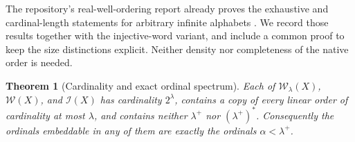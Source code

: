 \documentclass[11pt]{article}
\newtheorem{theorem}{Theorem}[section]
\theoremstyle{definition}
\theoremstyle{remark}
\newcommand{\WO}{\mathcal W}
\begin{document}
The repository's real-well-ordering report already proves the
exhaustive and cardinal-length statements for arbitrary infinite
alphabets \cite{ProveItReals}.  We record those results together
with the injective-word variant, and include a common proof
to keep the size distinctions explicit.  Neither density nor
completeness of the native order is needed.

\begin{theorem}[Cardinality and exact ordinal spectrum]\label{swo:sw:setspectrum}
Each of \(\WO_\lambda(X)\), \(\WO(X)\), and \(\mathcal I(X)\)
has cardinality \(2^\lambda\), contains a copy of every linear order
of cardinality at most \(\lambda\), and contains neither
\(\lambda^+\) nor \((\lambda^+)^*\).
Consequently the ordinals embeddable in any of them are exactly
the ordinals \(\alpha<\lambda^+\).
\end{theorem}
\end{document}
